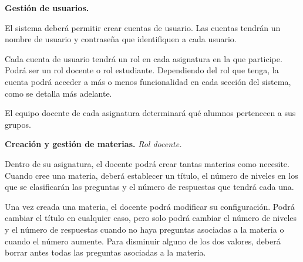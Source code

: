 \begin{rf0}

	\item \textbf{Gestión de usuarios.}
			\begin{rf0*}
				\item El sistema deberá permitir crear cuentas de usuario. Las cuentas tendrán un nombre de usuario y contraseña que identifiquen a cada usuario.
				\item Cada cuenta de usuario tendrá un rol en cada asignatura en la que participe. Podrá ser un rol docente o rol estudiante. Dependiendo del rol que tenga, la cuenta podrá acceder a más o menos funcionalidad en cada sección del sistema, como se detalla más adelante.
				\item El equipo docente de cada asignatura determinará qué alumnos pertenecen a sus grupos.
			\end{rf0*} 

	\item \textbf{Creación y gestión de materias.} \textit{Rol docente.} 
			\begin{rf0*}
				\item Dentro de su asignatura, el docente podrá crear tantas materias como necesite. Cuando cree una materia, deberá establecer un título, el número de niveles en los que se clasificarán las preguntas y el número de respuestas que tendrá cada una.
				\item Una vez creada una materia, el docente podrá modificar su configuración. Podrá cambiar el título en cualquier caso, pero solo podrá cambiar el número de niveles y el número de respuestas cuando no haya preguntas asociadas a la materia o cuando el número aumente. Para disminuir alguno de los dos valores, deberá borrar antes todas las preguntas asociadas a la materia.
			\end{rf0*}


\end{rf0}
